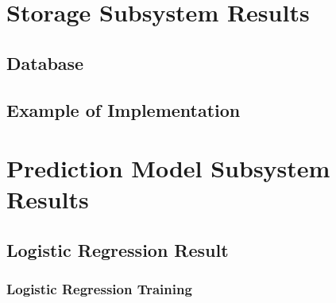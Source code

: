 \documentclass[12pt,oneside,openright,a4paper]{cpe-english-project}
\begin{document}
\section{Storage Subsystem Results}
\subsection{Database}
\subsection{Example of Implementation}


\section{Prediction Model Subsystem Results}
\subsection{Logistic Regression Result}
\subsubsection{Logistic Regression Training}
\end{document}

